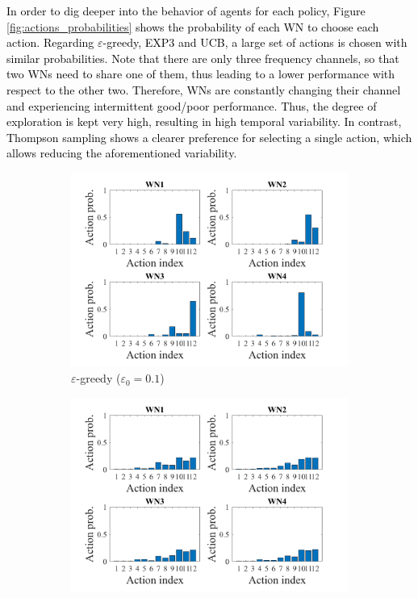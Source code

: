 \documentclass{article}
\begin{document}
	\textcolor{black}{In order to dig deeper into the behavior of agents for each policy, Figure \ref{fig:actions_probabilities} shows the probability of each WN to choose each action. Regarding $\varepsilon$-greedy, EXP3 and UCB, a large set of actions is chosen with similar probabilities. Note that there are only three frequency channels, so that two WNs need to share one of them, thus leading to a lower performance with respect to the other two. Therefore, WNs are constantly changing their channel and experiencing intermittent good/poor performance. Thus, the degree of exploration is kept very high, resulting in high temporal variability. In contrast, Thompson sampling shows a clearer preference for selecting a single action, which allows reducing the aforementioned variability.}
	
	\begin{figure}[t!]
		\centering
		\begin{subfigure}[b]{0.43\textwidth}
			\includegraphics[width=\textwidth]{images/actions_probability_EG}
			\caption{$\varepsilon$-greedy ($\varepsilon_0  = 0.1$)}
			\label{fig:actions_probability_EG}
		\end{subfigure}
		\begin{subfigure}[b]{0.43\textwidth}
			\includegraphics[width=\textwidth]{images/actions_probability_EXP3}

\end{subfigure}
\end{figure}
\end{document}
